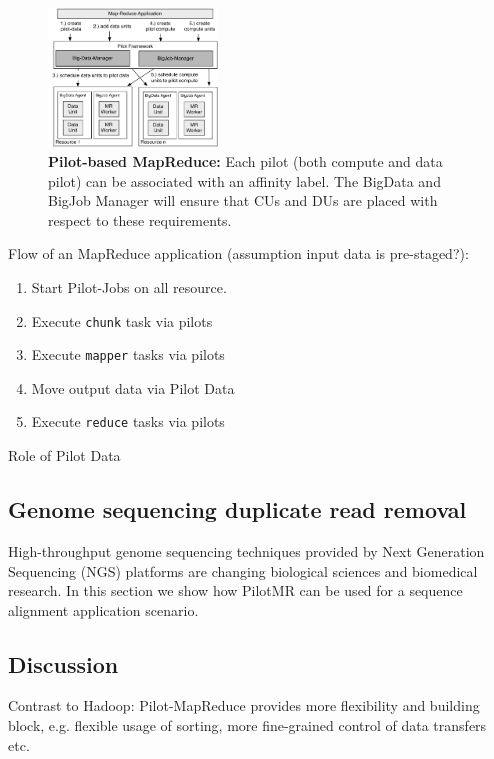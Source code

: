 \documentclass{acm_proc_article-sp}
\newcommand{\pilotjobs}{Pilot-Jobs\xspace}
\begin{document}
\begin{figure}[htbp]
	\centering
	\includegraphics[width=0.4\textwidth]{figures/mapreduce-pilotdata.pdf}
	\caption{\textbf{Pilot-based MapReduce:} Each pilot (both compute and data 
	pilot) can be associated with an affinity label. The BigData and BigJob 
	Manager will ensure that CUs and DUs are placed with respect to these 
	requirements.}
	\label{fig:figures_mapreduce-pilotdata}
\end{figure}

Flow of an MapReduce application (assumption input data is pre-staged?):
\begin{enumerate}
	\item Start \pilotjobs on all resource.
	\item Execute \texttt{chunk} task via pilots
	\item Execute \texttt{mapper} tasks via pilots
	\item Move output data via Pilot Data
	\item Execute \texttt{reduce} tasks via pilots 
\end{enumerate}

Role of Pilot Data

\subsection{Genome sequencing duplicate read removal}

High-throughput genome sequencing techniques provided by Next Generation
Sequencing (NGS) platforms are changing biological sciences and biomedical
research. In this section we show how PilotMR can be used for a sequence
alignment application scenario.

\subsection{Discussion}

Contrast to Hadoop:
Pilot-MapReduce provides more flexibility and building block, e.g. flexible 
usage of sorting, more fine-grained control of data transfers etc.
\end{document}
